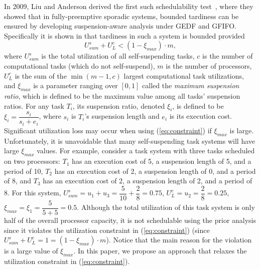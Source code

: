 In 2009, Liu and Anderson derived the first such schedulability test~\cite{Liu3}, where they showed that in fully-preemptive sporadic systems, bounded tardiness can be ensured by developing suspension-aware analysis under GEDF and GFIFO. Specifically it is shown in \cite{Liu3} that tardiness in such a system is bounded provided 
\begin{equation}\label{eq:constraint} U_{sum}^s + U_L^c < (1-\xi_{max}) \cdot m , \end{equation}
where $U_{sum}^s$ is the total utilization of all self-suspending tasks, $c$ is the number of computational tasks (which do not self-suspend), $m$ is the number of processors, $U_L^c$ is the sum of the $\min(m-1,c)$ largest computational task utilizations, and $\xi_{max}$ is a parameter ranging over $[0,1]$ called the \textit{maximum suspension ratio}, which is defined to be the maximum value among all tasks' suspension ratios. For any task $T_i$, its suspension ratio, denoted $\xi_i$, is defined to be $\xi_i = \dfrac{s_i}{s_i+e_i}$, where $s_i$ is $T_i$'s suspension length and $e_i$ is its execution cost.  Significant utilization loss may occur when using (\ref{eq:constraint}) if $\xi_{max}$ is large. Unfortunately, it is unavoidable that many self-suspending task systems will have large $\xi_{max}$ values. For example, consider a task system with three tasks scheduled on two processors: $T_1$ has an execution cost of 5, a suspension length of 5, and a period of 10, $T_2$ has an execution cost of 2, a suspension length of 0, and a period of 8, and $T_3$ has an execution cost of 2, a suspension length of 2, and a period of 8. For this system, $U_{sum}^s = u_1+u_3= \dfrac{5}{10} + \dfrac{2}{8} = 0.75$, $U_L^c = u_2 = \dfrac{2}{8} = 0.25$, $\xi_{max} = \xi_1 = \dfrac{5}{5+5} = 0.5$. Although the total utilization of this task system is only half of the overall processor capacity, it is not schedulable using the prior analysis since it violates the utilization constraint in (\ref{eq:constraint}) (since $U_{sum}^s+U_L^c =1=(1-\xi_{max}) \cdot m$). Notice that the main reason for the violation is a large value of $\xi_{max}$. In this paper, we propose an approach that relaxes the utilization constraint in (\ref{eq:constraint}). 

